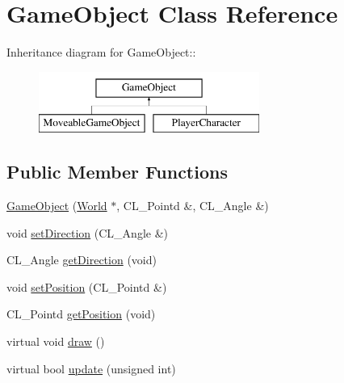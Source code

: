 \hypertarget{classGameObject}{
\section{GameObject Class Reference}
\label{classGameObject}
}
Inheritance diagram for GameObject::\begin{figure}[H]
\begin{center}
\leavevmode
\includegraphics[height=2cm]{classGameObject}
\end{center}
\end{figure}
\subsection*{Public Member Functions}
\begin{DoxyCompactItemize}
\item 
\hyperlink{classGameObject_ad8d1bdb3864097a3723ddac03b947f95}{GameObject} (\hyperlink{classWorld}{World} $\ast$, CL\_\-Pointd \&, CL\_\-Angle \&)
\item 
void \hyperlink{classGameObject_a0eabb72240499a1878b420b5c3f0ecf3}{setDirection} (CL\_\-Angle \&)
\item 
CL\_\-Angle \hyperlink{classGameObject_a456901f9f0b261b206db248960633e50}{getDirection} (void)
\item 
void \hyperlink{classGameObject_a4fd1eeb91d5a220dde7b8574be19b651}{setPosition} (CL\_\-Pointd \&)
\item 
CL\_\-Pointd \hyperlink{classGameObject_adfc89f23ef6d0819c183f1c26bb27e58}{getPosition} (void)
\item 
virtual void \hyperlink{classGameObject_abb64143e72358beb808db22182517802}{draw} ()
\item 
virtual bool \hyperlink{classGameObject_ad2f3cd5d1f5a11b237507cd3ee98b95d}{update} (unsigned int)
\end{DoxyCompactItemize}
